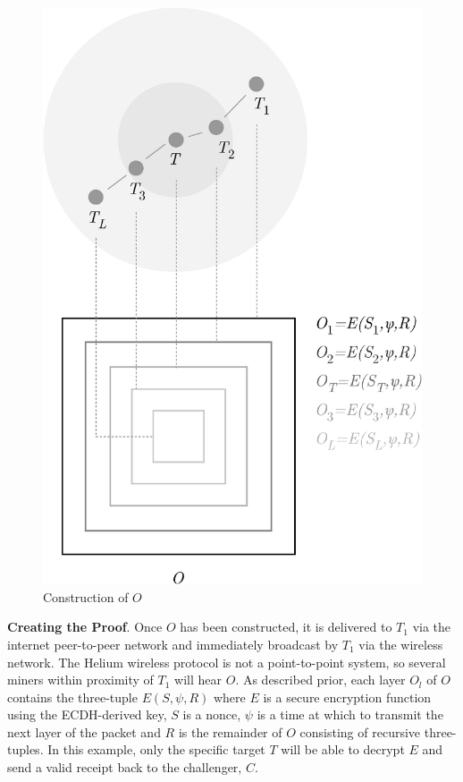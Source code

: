 \documentclass[10pt, nonatbib, nocopyrightspace, reprint]{sigplanconf}
\begin{document}
\begin{figure}[ht]
    \begin{center}
          \includegraphics[width=\columnwidth]{o_construction.eps}
          \caption{Construction of $O$}
          \label{fig:poc-o_construction}
     \end{center}
\end{figure}

\textbf{Creating the Proof}. Once $O$ has been constructed, it is delivered to $T_1$ via the internet peer-to-peer network and immediately broadcast by $T_1$ via the wireless network. The Helium wireless protocol is not a point-to-point system, so several miners within proximity of $T_1$ will hear $O$. As described prior, each layer $O_l$ of $O$ contains the three-tuple ${E\left(S, \psi, R\right)}$ where $E$ is a secure encryption function using the ECDH-derived key, $S$ is a nonce, $\psi$ is a time at which to transmit the next layer of the packet and $R$ is the remainder of $O$ consisting of recursive three-tuples. In this example, only the specific target $T$ will be able to decrypt $E$ and send a valid receipt back to the challenger, $C$.
\end{document}
